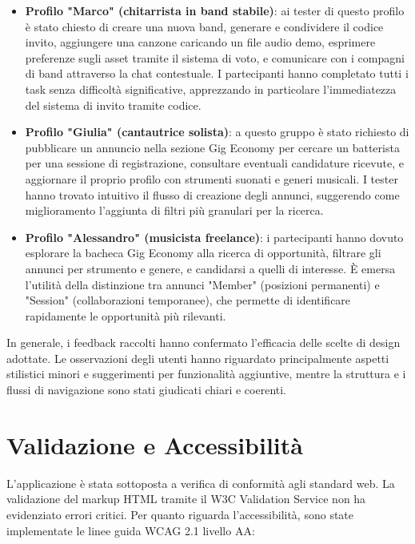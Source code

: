 \documentclass{report}
\begin{document}
\begin{itemize}
    \item \textbf{Profilo "Marco" (chitarrista in band stabile)}: ai tester di questo profilo è stato chiesto di creare una nuova band, generare e condividere il codice invito, aggiungere una canzone caricando un file audio demo, esprimere preferenze sugli asset tramite il sistema di voto, e comunicare con i compagni di band attraverso la chat contestuale. I partecipanti hanno completato tutti i task senza difficoltà significative, apprezzando in particolare l'immediatezza del sistema di invito tramite codice.

    \item \textbf{Profilo "Giulia" (cantautrice solista)}: a questo gruppo è stato richiesto di pubblicare un annuncio nella sezione Gig Economy per cercare un batterista per una sessione di registrazione, consultare eventuali candidature ricevute, e aggiornare il proprio profilo con strumenti suonati e generi musicali. I tester hanno trovato intuitivo il flusso di creazione degli annunci, suggerendo come miglioramento l'aggiunta di filtri più granulari per la ricerca.

    \item \textbf{Profilo "Alessandro" (musicista freelance)}: i partecipanti hanno dovuto esplorare la bacheca Gig Economy alla ricerca di opportunità, filtrare gli annunci per strumento e genere, e candidarsi a quelli di interesse. È emersa l'utilità della distinzione tra annunci "Member" (posizioni permanenti) e "Session" (collaborazioni temporanee), che permette di identificare rapidamente le opportunità più rilevanti.
\end{itemize}

In generale, i feedback raccolti hanno confermato l'efficacia delle scelte di design adottate. Le osservazioni degli utenti hanno riguardato principalmente aspetti stilistici minori e suggerimenti per funzionalità aggiuntive, mentre la struttura e i flussi di navigazione sono stati giudicati chiari e coerenti.

\section{Validazione e Accessibilità}

L'applicazione è stata sottoposta a verifica di conformità agli standard web. La validazione del markup HTML tramite il W3C Validation Service non ha evidenziato errori critici. Per quanto riguarda l'accessibilità, sono state implementate le linee guida WCAG 2.1 livello AA:
\end{document}
